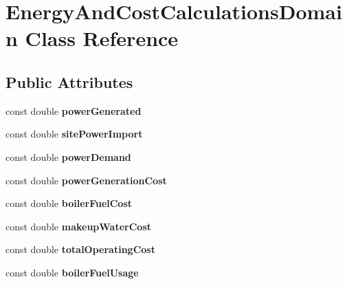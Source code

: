 \hypertarget{class_energy_and_cost_calculations_domain}{}\section{Energy\+And\+Cost\+Calculations\+Domain Class Reference}
\label{class_energy_and_cost_calculations_domain}
\subsection*{Public Attributes}
\begin{DoxyCompactItemize}
\item 
\mbox{\label{class_energy_and_cost_calculations_domain_a116215c198adf330c14d9c03e1d2d78c}} 
const double {\bfseries power\+Generated}
\item 
\mbox{\label{class_energy_and_cost_calculations_domain_a4eed2d164d67ca333498757660bc1ebd}} 
const double {\bfseries site\+Power\+Import}
\item 
\mbox{\label{class_energy_and_cost_calculations_domain_ac537b1078c75f00b159a8bbff29b4ded}} 
const double {\bfseries power\+Demand}
\item 
\mbox{\label{class_energy_and_cost_calculations_domain_add4326cd43a135ca21253f934361a9ff}} 
const double {\bfseries power\+Generation\+Cost}
\item 
\mbox{\label{class_energy_and_cost_calculations_domain_accbae031b6d2c46b66123b554452684d}} 
const double {\bfseries boiler\+Fuel\+Cost}
\item 
\mbox{\label{class_energy_and_cost_calculations_domain_abfb7f02b4a0ae35f5694ba92838702e4}} 
const double {\bfseries makeup\+Water\+Cost}
\item 
\mbox{\label{class_energy_and_cost_calculations_domain_a7f0b7bc75ba0d112176f708638cae6c2}} 
const double {\bfseries total\+Operating\+Cost}
\item 
\mbox{\label{class_energy_and_cost_calculations_domain_a5bbf5c72c06ea6e8228ffa0855610245}} 
const double {\bfseries boiler\+Fuel\+Usage}
\end{DoxyCompactItemize}
